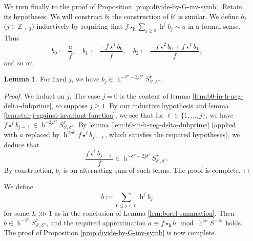 \documentclass[reqno]{amsart}
\DeclareMathOperator{\h}{h}
\theoremstyle{plain} \newtheorem{theorem} {Theorem}
\theoremstyle{definition} \newtheorem{definition} [theorem] {Definition}
\theoremstyle{itplain} %
\newtheorem{lemma}[theorem]{Lemma}
\numberwithin{equation}{section}
\numberwithin{theorem}{section}
\renewcommand{\geq}{\geqslant}
\renewcommand{\leq}{\leqslant}
\begin{document}
We turn finally to the proof of Proposition \ref{prop:divide-by-G-inv-symb}.  Retain its hypotheses.  We will construct $b$; the construction of $b'$ is similar.  We define $b_j$ ($j \in \mathbb{Z}_{\geq 0}$) inductively by requiring that $f \star_{\h} \sum_{j \geq 0} \h^j b_j \sim a$ in a formal sense.  Thus
\[
  b_0 := \frac{a}{f}, \quad b_1 := \frac{- f \star^1 b_0}{f}, \quad b_2 := \frac{- f \star^2 b_0 + f \star^1 b_1}{f},
\]
and so on.
\begin{lemma}
  For fixed $j$, we have $b_j \in \h^{-\delta '' - 2 j \delta '} S^\tau_{\delta ', \delta ''}$.
\end{lemma}
\begin{proof}
  We induct on $j$.  The case $j=0$ is the content of lemma \ref{lem:b0-in-h-neg-delta-dubprime}, so suppose $j \geq 1$.  By our inductive hypothesis and lemma \ref{lem:star-j-against-invariant-function}, we see that for $\ell \in \{1, \dotsc, j\}$, we have $f \star^{\ell} b_{j - \ell} \in \h^{- 2 j \delta ' } S^\tau_{\delta ', \delta''}$.  By lemma \ref{lem:b0-in-h-neg-delta-dubprime} (applied with $a$ replaced by $\h^{2 j \delta '} f \star^{\ell} b_{j - \ell}$, which satisfies the required hypotheses), we deduce that
  \[
    \frac{f \star^{\ell} b_{j - \ell}}{f} \in \h^{- \delta '' - 2 j \delta '} S^\tau_{\delta ', \delta ''}.
  \]
  By construction, $b_j$ is an alternating sum of such terms.  The proof is complete.
\end{proof}

We define
\[
  b := \sum_{0 \leq j < L} \h^j b_j
\]
for some $L \ggg 1$ as in the conclusion of Lemma \ref{lem:borel-summation}.  Then $b \in \h^{- \delta ''} S^\tau_{\delta ', \delta ''}$, and the required approximation $a \equiv f \star_{\h} b \mod{\h^\infty S^{-\infty}}$ holds.  The proof of Proposition \ref{prop:divide-by-G-inv-symb} is now complete.
\end{document}
